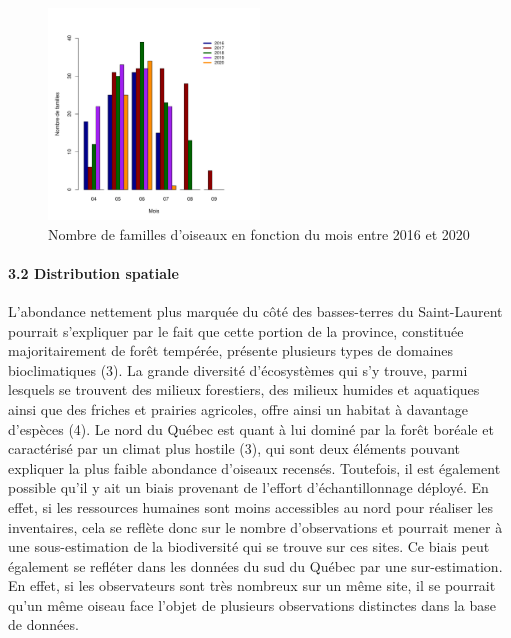 \documentclass[9pt,twocolumn,twoside,]{pnas-new}
\begin{document}
\begin{figure}
\centering
\includegraphics[width=0.5\textwidth,height=0.35\textheight]{../figures/observation_mois_famille.pdf}
\caption{Nombre de familles d'oiseaux en fonction du mois entre 2016 et
2020\label{fig:plot3}}
\end{figure}

\hypertarget{distribution-spatiale}{%
\paragraph{3.2 Distribution spatiale}\label{distribution-spatiale}}

\hfill\break
L'abondance nettement plus marquée du côté des basses-terres du
Saint-Laurent pourrait s'expliquer par le fait que cette portion de la
province, constituée majoritairement de forêt tempérée, présente
plusieurs types de domaines bioclimatiques (3). La grande diversité
d'écosystèmes qui s'y trouve, parmi lesquels se trouvent des milieux
forestiers, des milieux humides et aquatiques ainsi que des friches et
prairies agricoles, offre ainsi un habitat à davantage d'espèces (4). Le
nord du Québec est quant à lui dominé par la forêt boréale et
caractérisé par un climat plus hostile (3), qui sont deux éléments
pouvant expliquer la plus faible abondance d'oiseaux recensés.
Toutefois, il est également possible qu'il y ait un biais provenant de
l'effort d'échantillonnage déployé. En effet, si les ressources humaines
sont moins accessibles au nord pour réaliser les inventaires, cela se
reflète donc sur le nombre d'observations et pourrait mener à une
sous-estimation de la biodiversité qui se trouve sur ces sites. Ce biais
peut également se refléter dans les données du sud du Québec par une
sur-estimation. En effet, si les observateurs sont très nombreux sur un
même site, il se pourrait qu'un même oiseau face l'objet de plusieurs
observations distinctes dans la base de données.
\end{document}
